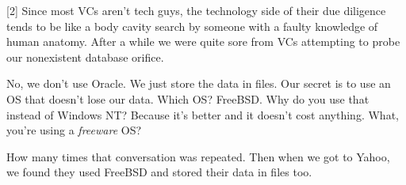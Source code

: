 [2] Since most
                  VCs aren't tech guys, the technology side of their due
                  diligence tends to be like a body cavity search by someone
                  with a faulty knowledge of human anatomy. After a while we
                  were quite sore from VCs attempting to probe our nonexistent
                  database orifice.

No, we don't use Oracle. We just
                  store the data in files. Our secret is to use an OS that
                  doesn't lose our data. Which OS? FreeBSD. Why do you use that
                  instead of Windows NT? Because it's better and it doesn't cost
                  anything. What, you're using a
                  \emph{freeware} OS?

How many times that
                  conversation was repeated. Then when we got to Yahoo, we found
                  they used FreeBSD and stored their data in files too.


              
            
          
